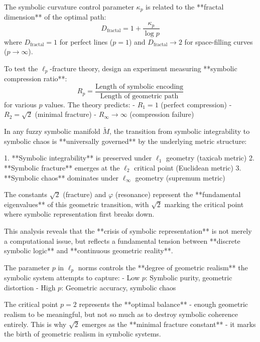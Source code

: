 \begin{proposition}
\label{prop:bk5_fractal_dimension_connection}
The symbolic curvature control parameter $\kappa_p$ is related to the **fractal dimension** of the optimal path:
$$D_{\text{fractal}} = 1 + \frac{\kappa_p}{\log p}$$
where $D_{\text{fractal}} = 1$ for perfect lines ($p = 1$) and $D_{\text{fractal}} \to 2$ for space-filling curves ($p \to \infty$).
\end{proposition}

\begin{definition}
\label{def:bk5_symbolic_compression_experiment}
To test the $\ell_p$-fracture theory, design an experiment measuring **symbolic compression ratio**:
$$R_p = \frac{\text{Length of symbolic encoding}}{\text{Length of geometric path}}$$
for various $p$ values. The theory predicts:
- $R_1 = 1$ (perfect compression)
- $R_2 = \sqrt{2}$ (minimal fracture)
- $R_\infty \to \infty$ (compression failure)
\end{definition}

\begin{theorem}
\label{thm:bk5_fundamental_norm_fracture}
In any fuzzy symbolic manifold $\tilde{M}$, the transition from symbolic integrability to symbolic chaos is **universally governed** by the underlying metric structure:

1. **Symbolic integrability** is preserved under $\ell_1$ geometry (taxicab metric)
2. **Symbolic fracture** emerges at the $\ell_2$ critical point (Euclidean metric)  
3. **Symbolic chaos** dominates under $\ell_\infty$ geometry (supremum metric)

The constants $\sqrt{2}$ (fracture) and $\varphi$ (resonance) represent the **fundamental eigenvalues** of this geometric transition, with $\sqrt{2}$ marking the critical point where symbolic representation first breaks down.
\end{theorem}

\begin{demonstratio}
\label{demonstratio:bk5_geometry_symbol_unity}
This analysis reveals that the **crisis of symbolic representation** is not merely a computational issue, but reflects a fundamental tension between **discrete symbolic logic** and **continuous geometric reality**. 

The parameter $p$ in $\ell_p$ norms controls the **degree of geometric realism** the symbolic system attempts to capture:
- Low $p$: Symbolic purity, geometric distortion
- High $p$: Geometric accuracy, symbolic chaos

The critical point $p = 2$ represents the **optimal balance** - enough geometric realism to be meaningful, but not so much as to destroy symbolic coherence entirely. This is why $\sqrt{2}$ emerges as the **minimal fracture constant** - it marks the birth of geometric realism in symbolic systems.
\end{demonstratio}

